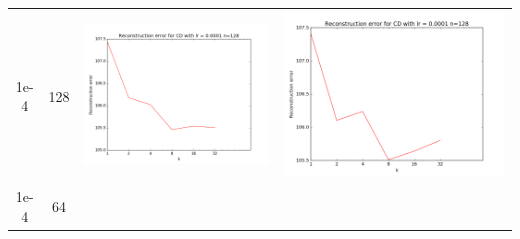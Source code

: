 \documentclass[12pt]{report}
\begin{document}
\begin{table}[H]
\begin{tabular}{ | c | c | c | c |}
\begin{minipage}{.3\textwidth}
    \end{minipage}
    \\ \hline
    1e-4 & 128 &
    \begin{minipage}{.3\textwidth}
      \includegraphics[scale=0.25]{train_cd_lr_0_0001_n_128.png}
    \end{minipage} &
    \begin{minipage}{.3\textwidth}
      \includegraphics[scale=0.25]{cd_lr_0_0001_n_128.png}
    \end{minipage}
    \\ \hline
    1e-4 & 64 &
    \begin{minipage}{.3\textwidth}

\end{minipage}
\end{tabular}
\end{table}
\end{document}
